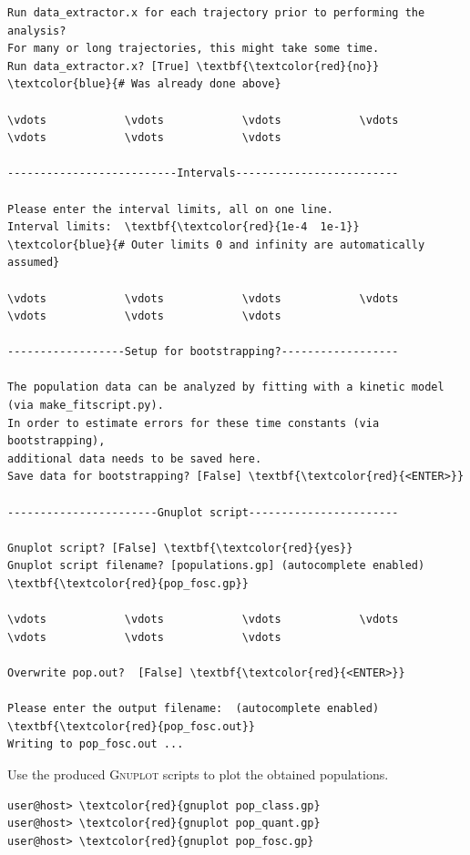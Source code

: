 \documentclass[a4paper,11pt,DIV=15,openany]{scrbook}
\begin{document}
\begin{oframed}
\begin{Verbatim}[commandchars=\\\{\}]
Run data_extractor.x for each trajectory prior to performing the analysis?
For many or long trajectories, this might take some time.
Run data_extractor.x? [True] \textbf{\textcolor{red}{no}}          \textcolor{blue}{# Was already done above}

\vdots            \vdots            \vdots            \vdots            \vdots            \vdots            \vdots            

--------------------------Intervals-------------------------

Please enter the interval limits, all on one line.
Interval limits:  \textbf{\textcolor{red}{1e-4  1e-1}}          \textcolor{blue}{# Outer limits 0 and infinity are automatically assumed}

\vdots            \vdots            \vdots            \vdots            \vdots            \vdots            \vdots            

------------------Setup for bootstrapping?------------------

The population data can be analyzed by fitting with a kinetic model (via make_fitscript.py). 
In order to estimate errors for these time constants (via bootstrapping), 
additional data needs to be saved here.
Save data for bootstrapping? [False] \textbf{\textcolor{red}{<ENTER>}}

-----------------------Gnuplot script-----------------------

Gnuplot script? [False] \textbf{\textcolor{red}{yes}}
Gnuplot script filename? [populations.gp] (autocomplete enabled) \textbf{\textcolor{red}{pop_fosc.gp}}

\vdots            \vdots            \vdots            \vdots            \vdots            \vdots            \vdots            

Overwrite pop.out?  [False] \textbf{\textcolor{red}{<ENTER>}}

Please enter the output filename:  (autocomplete enabled) \textbf{\textcolor{red}{pop_fosc.out}}
Writing to pop_fosc.out ...
\end{Verbatim}
\end{oframed}

\normalsize
Use the produced \textsc{Gnuplot} scripts to plot the obtained populations.
\begin{Verbatim}[commandchars=\\\{\}]
user@host> \textcolor{red}{gnuplot pop_class.gp}
user@host> \textcolor{red}{gnuplot pop_quant.gp}
user@host> \textcolor{red}{gnuplot pop_fosc.gp}
\end{Verbatim}
\end{document}
